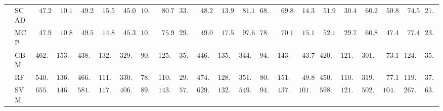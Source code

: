 \begin{tabular}{llllllllllllllllllllll}
	& SCAD  & $\phantom{0}47.25$ & $\phantom{0}10.14$ & $\phantom{0}49.26$ & $\phantom{0}15.59$ & $\phantom{0}45.05$ & $10.33$ & $\phantom{0}80.73$ & $33.47$ & $\phantom{0}48.21$ & $\phantom{0}13.95$ & $\phantom{0}81.17$ & $68.26$ & $\phantom{0}69.82$ & $\phantom{0}14.39$ & $\phantom{0}51.96$ & $\phantom{0}30.40$ & $\phantom{0}60.25$ & $\phantom{0}50.84$ & $\phantom{0}74.52$ & $21.16$ \\
	& MCP  & $\phantom{0}47.96$ & $\phantom{0}10.83$ & $\phantom{0}49.51$ & $\phantom{0}14.84$ & $\phantom{0}45.32$ & $10.14$ & $\phantom{0}75.98$ & $29.39$ & $\phantom{0}49.06$ & $\phantom{0}17.54$ & $\phantom{0}97.64$ & $78.45$ & $\phantom{0}70.14$ & $\phantom{0}15.10$ & $\phantom{0}52.12$ & $\phantom{0}29.79$ & $\phantom{0}60.81$ & $\phantom{0}47.45$ & $\phantom{0}77.41$ & $23.86$ \\
	& GBM  & $462.42$ & $153.08$ & $438.75$ & $132.30$ & $329.77$ & $90.89$ & $125.16$ & $35.21$ & $446.56$ & $135.46$ & $344.83$ & $94.89$ & $143.48$ & $\phantom{0}43.70$ & $420.52$ & $121.39$ & $301.37$ & $\phantom{0}73.14$ & $124.61$ & $35.86$ \\
	& RF  & $540.97$ & $136.58$ & $466.03$ & $111.18$ & $330.46$ & $78.76$ & $110.13$ & $29.18$ & $474.40$ & $128.25$ & $351.13$ & $80.23$ & $151.07$ & $\phantom{0}49.86$ & $450.25$ & $110.50$ & $319.58$ & $\phantom{0}77.19$ & $119.52$ & $37.83$ \\
	& SVM  & $655.71$ & $146.59$ & $581.13$ & $117.87$ & $406.59$ & $89.66$ & $143.00$ & $57.08$ & $629.70$ & $132.87$ & $549.67$ & $94.82$ & $437.80$ & $101.11$ & $598.30$ & $121.48$ & $502.02$ & $104.82$ & $267.80$ & $63.93$ \\
	\hline 
\end{tabular}